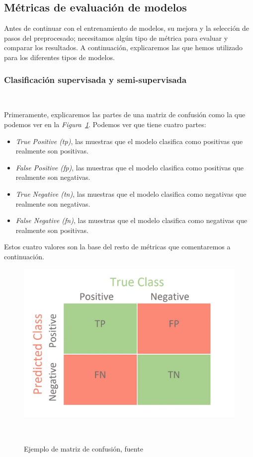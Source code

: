 \subsection{Métricas de evaluación de modelos}

Antes de continuar con el entrenamiento de modelos, su mejora y la selección de pasos del preprocesado; necesitamos algún tipo de métrica para evaluar y comparar los resultados. A continuación, explicaremos las que hemos utilizado para los diferentes tipos de modelos.

\subsubsection{Clasificación supervisada y semi-supervisada}\ \label{sec:classification-metrics}

Primeramente, explicaremos las partes de una matriz de confusión como la que podemos ver en la \textit{Figura\ \ref{fig:confusion-matrix-example}}. Podemos ver que tiene cuatro partes:

\begin{itemize}
    \item \textit{True Positive (tp)}, las muestras que el modelo clasifica como positivas que realmente son positivas.
    \item \textit{False Positive (fp)}, las muestras que el modelo clasifica como positivas que realmente son negativas.
    \item \textit{True Negative (tn)}, las muestras que el modelo clasifica como negativas que realmente son negativas.
    \item \textit{False Negative (fn)}, las muestras que el modelo clasifica como negativas que realmente son positivas.
\end{itemize}

Estos cuatro valores son la base del resto de métricas que comentaremos a continuación.

\begin{figure}[!ht]
    \centering
    \includegraphics[width=0.7\linewidth]{media/images/confusion-matrix-example.png}
    \caption{Ejemplo de matriz de confusión, fuente\ \cite{Confusio71:online}}\ \label{fig:confusion-matrix-example}
\end{figure}

